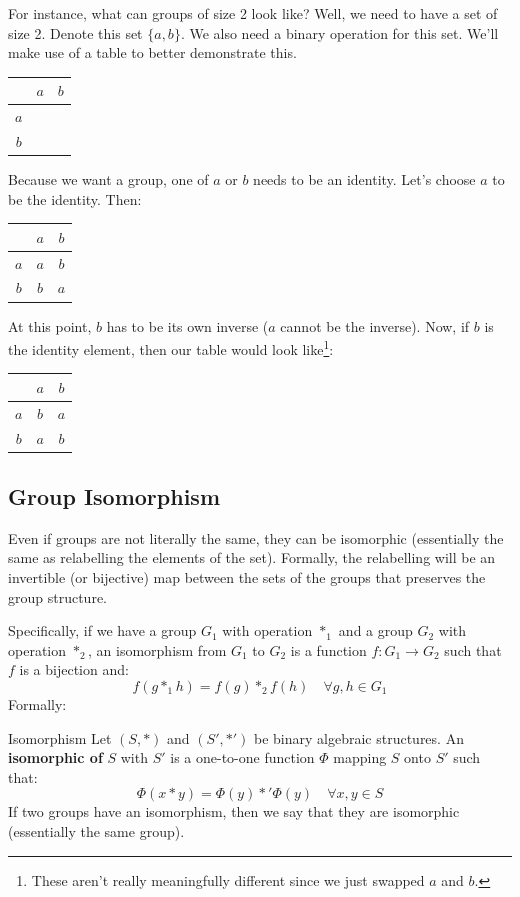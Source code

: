 \documentclass[letterpaper]{article}
\begin{document}
\bigskip 

For instance, what can groups of size 2 look like? Well, we need to have a set of size 2. Denote this set $\{a, b\}$. We also need a binary operation for this set. We'll make use of a table to better demonstrate this.
\begin{center}
    \begin{tabular}{c|c c}
            & $a$ & $b$ \\ 
        \hline 
        $a$ &     &     \\ 
        $b$ &     &     
    \end{tabular}
\end{center}
Because we want a group, one of $a$ or $b$ needs to be an identity. Let's choose $a$ to be the identity. Then:
\begin{center}
    \begin{tabular}{c|c c}
            & $a$ & $b$ \\ 
        \hline 
        $a$ & $a$ & $b$ \\ 
        $b$ & $b$ & $a$ 
    \end{tabular}
\end{center}
At this point, $b$ has to be its own inverse ($a$ cannot be the inverse). Now, if $b$ is the identity element, then our table would look like\footnote{These aren't really meaningfully different since we just swapped $a$ and $b$.}:
\begin{center}
    \begin{tabular}{c|c c}
            & $a$ & $b$ \\ 
        \hline 
        $a$ & $b$ & $a$ \\ 
        $b$ & $a$ & $b$ 
    \end{tabular}
\end{center}

\subsection{Group Isomorphism}
Even if groups are not literally the same, they can be isomorphic (essentially the same as relabelling the elements of the set). Formally, the relabelling will be an invertible (or bijective) map between the sets of the groups that preserves the group structure. 

\bigskip 

Specifically, if we have a group $G_1$ with operation $*_1$ and a group $G_2$ with operation $*_2$, an isomorphism from $G_1$ to $G_2$ is a function $f: G_1 \to G_2$ such that $f$ is a bijection and:
\[f(g *_1 h) = f(g) *_2 f(h) \quad \forall g, h \in G_1\]
Formally: 
\begin{definition}{Isomorphism}{}
    Let $(S, *)$ and $(S', *')$ be binary algebraic structures. An \textbf{isomorphic of} $S$ with $S'$ is a one-to-one function $\Phi$ mapping $S$ onto $S'$ such that:
    \[\Phi(x * y) = \Phi(y) *' \Phi(y) \quad \forall x, y \in S\]
    If two groups have an isomorphism, then we say that they are isomorphic (essentially the same group). 
\end{definition}
\end{document}

